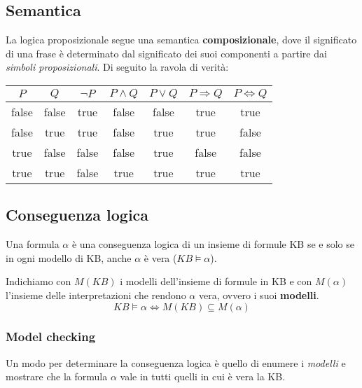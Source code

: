 \subsection{Semantica}
La logica proposizionale segue una semantica \textbf{composizionale}, dove il significato di una frase è determinato dal significato dei suoi componenti a partire dai \textit{simboli proposizionali}. Di seguito la ravola di verità:
\begin{table}[h!]
	\centering
	\begin{tabular}{|cc|ccccc|}
		\hline
		$P$ & $Q$ & $\neg P$ & $P \land Q$ & $P \lor Q$ & $ P \Rightarrow Q$ & $P \Leftrightarrow Q$\\
		\hline
		false & false & true & false & false & true & true \\
		false & true & true & false & true & true & false \\
		true & false & false & false & true & false & false \\
		true & true & false & true & true & true & true\\
		\hline
	\end{tabular}
\end{table}

\subsection{Conseguenza logica}
\begin{definition}
	Una formula $\alpha$ è una conseguenza logica di un insieme di formule KB se e solo se in ogni modello di KB, anche $\alpha$ è vera ($KB \models \alpha$).
\end{definition}
Indichiamo con $M(KB)$ i modelli dell'insieme di formule in KB e con $M(\alpha)$ l'insieme delle interpretazioni che rendono $\alpha$ vera, ovvero i suoi \textbf{modelli}.
\begin{equation}
	KB \models \alpha \Leftrightarrow M(KB) \subseteq M(\alpha)
\end{equation}

\subsubsection{Model checking}
Un modo per determinare la conseguenza logica è quello di enumere i \textit{modelli} e mostrare che la formula $\alpha$ vale in tutti quelli in cui è vera la KB.

